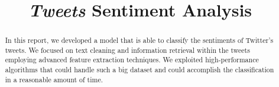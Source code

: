 \documentclass[conference]{IEEEtran}
\begin{document}
\title{\textit{Tweets} Sentiment Analysis}

\author{
\and
{}
}

\maketitle

\begin{abstract}
In this report, we developed a model that is able to classify the sentiments of Twitter's tweets.
We focused on text cleaning and information retrieval within the tweets employing advanced feature extraction techniques.
We exploited high-performance algorithms that could handle such a big dataset and could accomplish the classification in a reasonable amount of time.
\end{abstract}
\end{document}
